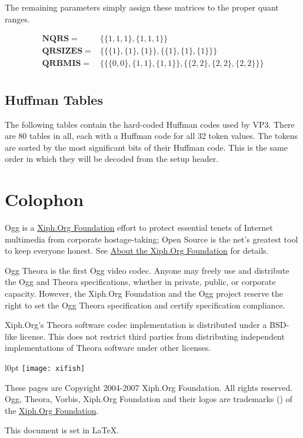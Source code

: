 \documentclass[9pt,letterpaper]{book}
\newcommand{\bitvar}[1]{\ensuremath{\mathbf{\bm{#1}}}}
\numberwithin{equation}{chapter}
\numberwithin{figure}{chapter}
\numberwithin{table}{chapter}
\begin{document}
The remaining parameters simply assign these matrices to the proper quant
 ranges.

\begin{align*}
\bitvar{NQRS}    = & \{ \{1, 1, 1\}, \{1, 1, 1\} \} \\
\bitvar{QRSIZES} = &
 \{ \{ \{1\}, \{1\}, \{1\} \}, \{ \{1\}, \{1\}, \{1\} \} \} \\
\bitvar{QRBMIS}  = &
 \{ \{ \{0, 0\}, \{1, 1\}, \{1, 1\} \}, \{ \{2, 2\}, \{2, 2\}, \{2, 2\} \} \} \\
\end{align*}

\section{Huffman Tables}
\label{app:vp3-huffman-tables}

The following tables contain the hard-coded Huffman codes used by VP3.
There are 80 tables in all, each with a Huffman code for all 32 token values.
The tokens are sorted by the most significant bits of their Huffman code.
This is the same order in which they will be decoded from the setup header.



\cleardoublepage
\chapter{Colophon}

Ogg is a \href{http://www.xiph.org}{Xiph.Org Foundation} effort to protect
 essential tenets of Internet multimedia from corporate hostage-taking; Open
 Source is the net's greatest tool to keep everyone honest.
See \href{http://www.xiph.org/about.html}{About the Xiph.Org Foundation} for
 details.

Ogg Theora is the first Ogg video codec.
Anyone may freely use and distribute the Ogg and Theora specifications, whether
 in private, public, or corporate capacity.
However, the Xiph.Org Foundation and the Ogg project reserve the right to set
 the Ogg Theora specification and certify specification compliance.

Xiph.Org's Theora software codec implementation is distributed under a BSD-like
 license.
This does not restrict third parties from distributing independent
 implementations of Theora software under other licenses.

\begin{wrapfigure}{l}{0pt}
\texttt{[image: xifish]}
\end{wrapfigure}

These pages are Copyright \textcopyright{} 2004-2007 Xiph.Org Foundation.
All rights reserved.
Ogg, Theora, Vorbis, Xiph.Org Foundation and their logos are trademarks
 (\texttrademark) of the \href{http://www.xiph.org}{Xiph.Org Foundation}.

This document is set in \LaTeX.



\cleardoublepage

\end{document}
